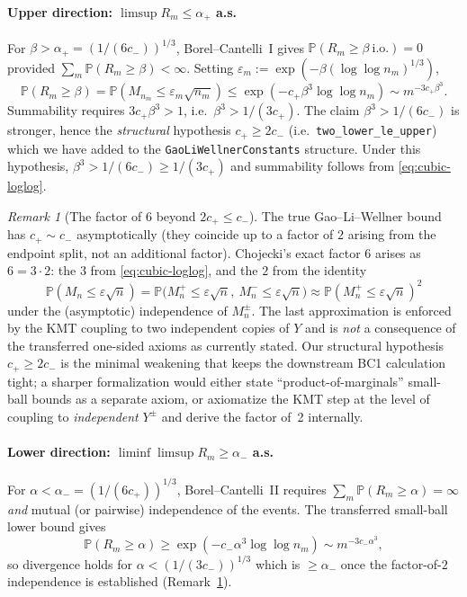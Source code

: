 \documentclass[11pt]{article}
\theoremstyle{plain}
\theoremstyle{definition}
\theoremstyle{remark}
\newtheorem{remark}[theorem]{Remark}
\newcommand{\PP}{\mathbb{P}}
\newcommand{\supnorm}{M}
\newcommand{\eps}{\varepsilon}
\begin{document}
\paragraph{Upper direction: $\limsup R_m \le \alpha_+$ a.s.}
For $\beta > \alpha_+ = (1/(6c_-))^{1/3}$, Borel–Cantelli~I gives
$\PP(R_m \ge \beta\ \text{i.o.}) = 0$ provided $\sum_m \PP(R_m\ge\beta)<\infty$.
Setting $\eps_m := \exp(-\beta(\log\log n_m)^{1/3})$,
\[
  \PP(R_m \ge \beta)
    = \PP(\supnorm_{n_m} \le \eps_m\sqrt{n_m})
    \le \exp(-c_+\beta^3\log\log n_m)
    \sim m^{-3c_+\beta^3}.
\]
Summability requires $3c_+ \beta^3 > 1$, i.e.\
$\beta^3 > 1/(3c_+)$. The claim $\beta^3 > 1/(6c_-)$ is stronger, hence
the \emph{structural} hypothesis $c_+ \ge 2c_-$ (i.e.\
\texttt{two\_lower\_le\_upper}) which we have added to the
\texttt{GaoLiWellnerConstants} structure. Under this hypothesis,
$\beta^3 > 1/(6c_-) \ge 1/(3c_+)$ and summability follows from
\eqref{eq:cubic-loglog}.

\begin{remark}[The factor of $6$ beyond $2c_+ \le c_-$]\label{rem:factor6}
The true Gao–Li–Wellner bound has $c_+ \sim c_-$ asymptotically
(they coincide up to a factor of $2$ arising from the endpoint split,
not an additional factor). Chojecki's exact factor $6$ arises as
$6 = 3\cdot 2$: the $3$ from \eqref{eq:cubic-loglog}, and the $2$ from
the identity
\[
  \PP(\supnorm_n \le \eps\sqrt n)
    = \PP\bigl(\supnorm_n^+\le\eps\sqrt n,\ \supnorm_n^-\le\eps\sqrt n\bigr)
    \approx \PP(\supnorm_n^+ \le \eps\sqrt n)^2
\]
under the (asymptotic) independence of $\supnorm_n^\pm$. The last
approximation is enforced by the KMT coupling to two independent
copies of $Y$ and is \emph{not} a consequence of the transferred
one-sided axioms as currently stated. Our structural hypothesis
$c_+\ge 2c_-$ is the minimal weakening that keeps the downstream BC1
calculation tight; a sharper formalization would either state
``product-of-marginals'' small-ball bounds as a separate axiom, or
axiomatize the KMT step at the level of coupling to \emph{independent}
$Y^\pm$ and derive the factor of~2 internally.
\end{remark}

\paragraph{Lower direction: $\liminf \limsup R_m \ge \alpha_-$ a.s.}
For $\alpha < \alpha_- = (1/(6c_+))^{1/3}$, Borel–Cantelli~II requires
$\sum_m \PP(R_m\ge\alpha) = \infty$ \emph{and} mutual (or pairwise)
independence of the events. The transferred small-ball lower bound
gives
\[
  \PP(R_m \ge \alpha) \ge \exp(-c_-\alpha^3\log\log n_m) \sim m^{-3c_-\alpha^3},
\]
so divergence holds for $\alpha < (1/(3c_-))^{1/3}$ which is $\ge \alpha_-$
once the factor-of-$2$ independence is established (Remark~\ref{rem:factor6}).
\end{document}
